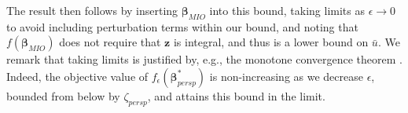\documentclass[mnsc,nonblindrev]{informs3} %
\newcommand{\ag}[1]{{\color{black}#1}}
\begin{document}
{The result then follows by inserting $\bm{\beta}_{MIO}$ into this bound, taking limits as $\epsilon \rightarrow 0$ to avoid including perturbation terms within our bound, and noting that $f(\bm{\beta}_{MIO})$ does not require that $\bm{z}$ is integral, and thus is a lower bound on $\bar{u}$. We remark that taking limits is justified by, e.g., the monotone convergence theorem \citep{grimmett2020probability}. Indeed, the objective value of $f_\epsilon(\bm{\beta}_{persp}^*)$ is non-increasing as we decrease $\epsilon$, bounded from below by $\zeta_{persp}$, and attains this bound in the limit. 
}
\end{document}
